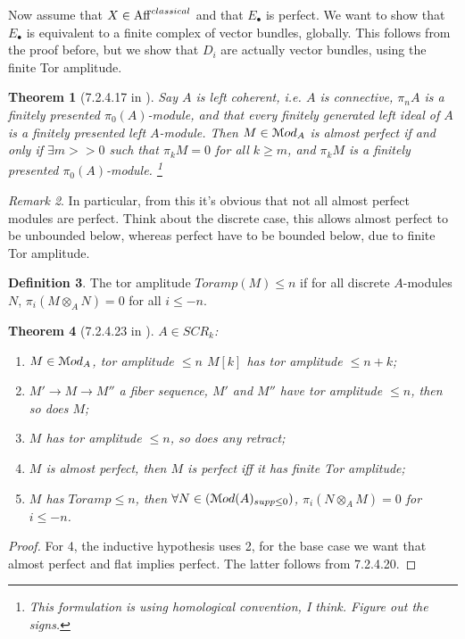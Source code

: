 \documentclass[10pt,a4paper,reqno,oneside]{book} %
\theoremstyle{plain}
\newtheorem{thm}{Theorem}[section]
\theoremstyle{definition}
\newtheorem{defin}[thm]{Definition}
\theoremstyle{remark}
\newtheorem{rem}[thm]{Remark}
\numberwithin{equation}{section}
\begin{document}
Now assume that $X \in \mathrm{Aff}^{classical}$ and that $E_{\bullet}$ is perfect. We want to show that $E_{\bullet}$
is equivalent to a finite complex of vector bundles, globally. This follows from the proof before, but we show that
$D_i$ are actually vector bundles, using the finite Tor amplitude.

\begin{thm}[7.2.4.17 in \cite{Lurie_Higher_algebra}]
Say $A$ is left coherent, i.e. $A$ is connective, $\pi_nA$ is a finitely presented $\pi_0(A)$-module, and that every
finitely generated left ideal of $A$ is a finitely presented left $A$-module. Then $M \in \mathcal M od_A$ is almost perfect
if and only if $\exists m >>0$ such that $\pi_k M = 0$ for all $k\geq m$, and $\pi_k M$ is a finitely presented
$\pi_0(A)$-module. \footnote{This formulation is using homological convention, I think. Figure out the signs.}
\end{thm}

\begin{rem}
In particular, from this it's obvious that not all almost perfect modules are perfect. Think about the discrete case,
this allows almost perfect to be unbounded below, whereas perfect have to be bounded below, due to finite Tor amplitude.
\end{rem}

\begin{defin}
The tor amplitude $Toramp(M) \leq n$ if for all discrete $A$-modules $N$, $\pi_i(M \otimes_A N) = 0$ for all $i\leq -n$.
\end{defin}

\begin{thm}[7.2.4.23 in \cite{Lurie_Higher_algebra}]
$A \in SCR_k$:
\begin{enumerate}
\item $M \in \mathcal M od_A$, tor amplitude $\leq n$ $M[k]$ has tor amplitude $\leq n+k$;
\item $M' \to M \to M''$ a fiber sequence, $M'$ and $M''$ have tor amplitude $\leq n$, then so does $M$;
\item $M$ has tor amplitude $\leq n$, so does any retract;
\item $M$ is almost perfect, then $M$ is perfect iff it has finite Tor amplitude;
\item $M$ has $Toramp \leq n$, then $\forall N \in (\mathcal M od(A)_{supp \leq 0})$, $\pi_i(N\otimes_A M) = 0$ for
	$i \leq -n$.
\end{enumerate}
\end{thm}

\begin{proof}
For 4, the inductive hypothesis uses 2, for the base case we want that almost perfect and flat implies perfect. The latter
follows from 7.2.4.20.
\end{proof}
\end{document}
